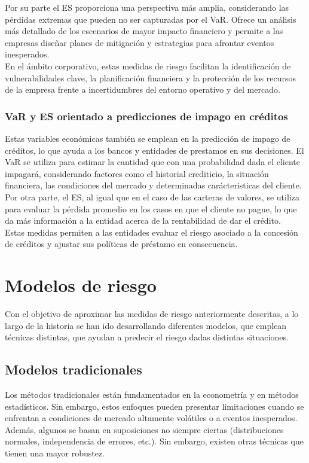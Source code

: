 \documentclass[11pt]{book}
\newcommand{\clearemptydoublepage}{\newpage{\pagestyle{empty}\cleardoublepage}}
\theoremstyle{plain} %
\theoremstyle{definition} %
\begin{document}
Por su parte el ES proporciona una perspectiva más amplia, considerando 
las pérdidas extremas que pueden no ser capturadas por el VaR. Ofrece un 
análisis más detallado de los escenarios de mayor impacto financiero y 
permite a las empresas diseñar planes de mitigación y estrategias para 
afrontar eventos inesperados.\\

En el ámbito corporativo, estas medidas de riesgo facilitan la identificación 
de vulnerabilidades clave, la planificación financiera y la protección de los 
recursos de la empresa frente a incertidumbres del entorno operativo y del 
mercado.

\subsection{VaR y ES orientado a predicciones de impago en créditos}
Estas variables económicas también se emplean en la predicción de impago 
de créditos, lo que ayuda a los bancos y entidades de prestamos en sus 
decisiones.
El VaR se utiliza para estimar la cantidad que con una probabilidad dada 
el cliente impagará, considerando factores como el historial crediticio, la 
situación financiera, las condiciones del mercado y determinadas 
carácteristicas del cliente. \\

Por otra parte, el ES, al igual que en el caso de las carteras de valores, se 
utiliza para evaluar la pérdida promedio en los casos en que el cliente no 
pague, lo que da más información a la entidad acerca de la rentabilidad de 
dar el crédito.\\

Estas medidas permiten a las entidades evaluar el riesgo asociado a la 
concesión de créditos y ajustar sus políticas de préstamo en consecuencia.\\


\clearemptydoublepage
\chapter{Modelos de riesgo}
Con el objetivo de aproximar las medidas de riesgo anteriormente descritas, 
a lo largo de la historia se han ido desarrollando diferentes modelos, que 
emplean técnicas distintas, que ayudan a predecir el riesgo dadas distintas 
situaciones.
\section{Modelos tradicionales}
Los métodos tradicionales están fundamentados en la econometría y en 
métodos estadísticos. Sin embargo, estos enfoques pueden presentar 
limitaciones cuando se enfrentan a condiciones de mercado altamente 
volátiles o a eventos inesperados. Además, algunos se basan en suposiciones 
no siempre ciertas (distribuciones normales, independencia de errores, etc.). 
Sin embargo, existen otras técnicas que tienen una mayor robustez. 
\end{document}
